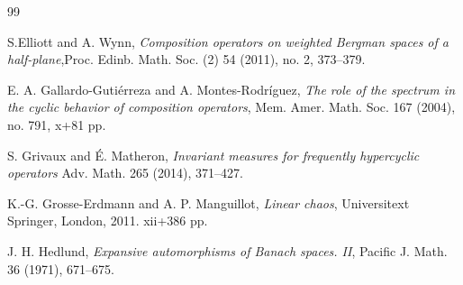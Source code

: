 \documentclass[11pt]{amsart}%
\numberwithin{equation}{section}
\theoremstyle{plain}
\theoremstyle{definition}
\theoremstyle{definition}
\begin{document}
\begin{thebibliography}{99}







 S.Elliott and A. Wynn, \emph{
Composition operators on weighted Bergman spaces of a half-plane},Proc. Edinb. Math. Soc. (2) 54 (2011), no. 2, 373–379.





 E. A. Gallardo-Gutiérreza and A. Montes-Rodríguez, \emph{
The role of the spectrum in the cyclic behavior of composition operators},
Mem. Amer. Math. Soc. 167 (2004), no. 791, x+81 pp.

 S. Grivaux and É. Matheron, \emph{
Invariant measures for frequently hypercyclic operators}
Adv. Math. 265 (2014), 371–427.

 K.-G. Grosse-Erdmann and A. P. Manguillot, \emph{
Linear chaos},
Universitext
Springer, London, 2011. xii+386 pp.





 J. H. Hedlund, \emph{
Expansive automorphisms of Banach spaces. II},
Pacific J. Math. 36 (1971), 671–675.



\end{thebibliography}
\end{document}
